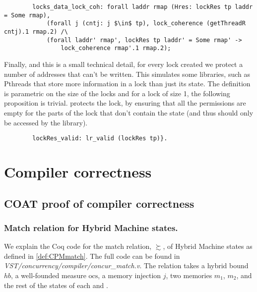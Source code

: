 \begin{lstlisting}
        locks_data_lock_coh: forall laddr rmap (Hres: lockRes tp laddr = Some rmap),
            (forall j (cntj: j $\in$ tp), lock_coherence (getThreadR cntj).1 rmap.2) /\
            (forall laddr' rmap', lockRes tp laddr' = Some rmap' ->
                lock_coherence rmap'.1 rmap.2);
\end{lstlisting}     
\noindent Finally, and this is a small technical detail, for every lock created we protect a number of addresses that can't be written. This simulates some libraries, such as Pthreads that store more information in a lock than just its state. The definition is parametric on the size of the locks and for a lock of size 1, the following proposition is trivial.  protects the lock, by ensuring that all the permissions are empty for the parts of the lock that don't contain the state (and thus should only be accessed by the library).
\begin{lstlisting}
        lockRes_valid: lr_valid (lockRes tp)}.
\end{lstlisting}	

\section{Compiler correctness}
\label{sec:implementation:compiler}

\subsection{COAT proof of compiler correctness}
\label{sec:implementation:COATproof}

\subsubsection{Match relation for Hybrid Machine states.}\label{coq:matchstateCPM}
We explain the Coq code for the match relation, $\succsim$, of Hybrid Machine states as defined in \cref{def:CPMmatch}. The full code can be found in \emph{VST/concurrency/compiler/concur\_match.v}. The relation takes  
a hybrid bound $hb$, 
a well-founded measure $\text{ocs}$, 
a memory injection $j$, 
two memories $m_1$, $m_2$, 
and the rest of the  states of each  and . 

